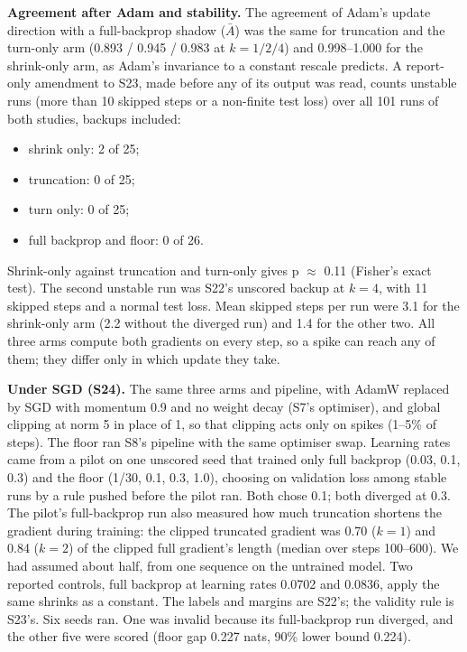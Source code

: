 \documentclass[10pt]{article}
\begin{document}
\textbf{Agreement after Adam and stability.} The agreement of Adam's update direction with a full-backprop shadow ($\bar{A}$) was the same for truncation and the turn-only arm (0.893 / 0.945 / 0.983 at $k = 1 / 2 / 4$) and 0.998--1.000 for the shrink-only arm, as Adam's invariance to a constant rescale predicts. A report-only amendment to S23, made before any of its output was read, counts unstable runs (more than 10 skipped steps or a non-finite test loss) over all 101 runs of both studies, backups included:

\begin{itemize}
\item shrink only: 2 of 25;
\item truncation: 0 of 25;
\item turn only: 0 of 25;
\item full backprop and floor: 0 of 26.
\end{itemize}

Shrink-only against truncation and turn-only gives p $\approx$ 0.11 (Fisher's exact test). The second unstable run was S22's unscored backup at $k = 4$, with 11 skipped steps and a normal test loss. Mean skipped steps per run were 3.1 for the shrink-only arm (2.2 without the diverged run) and 1.4 for the other two. All three arms compute both gradients on every step, so a spike can reach any of them; they differ only in which update they take.

\textbf{Under SGD (S24).} The same three arms and pipeline, with AdamW replaced by SGD with momentum 0.9 and no weight decay (S7's optimiser), and global clipping at norm 5 in place of 1, so that clipping acts only on spikes (1--5\% of steps). The floor ran S8's pipeline with the same optimiser swap. Learning rates came from a pilot on one unscored seed that trained only full backprop (0.03, 0.1, 0.3) and the floor (1/30, 0.1, 0.3, 1.0), choosing on validation loss among stable runs by a rule pushed before the pilot ran. Both chose 0.1; both diverged at 0.3. The pilot's full-backprop run also measured how much truncation shortens the gradient during training: the clipped truncated gradient was 0.70 ($k = 1$) and 0.84 ($k = 2$) of the clipped full gradient's length (median over steps 100--600). We had assumed about half, from one sequence on the untrained model. Two reported controls, full backprop at learning rates 0.0702 and 0.0836, apply the same shrinks as a constant. The labels and margins are S22's; the validity rule is S23's. Six seeds ran. One was invalid because its full-backprop run diverged, and the other five were scored (floor gap 0.227 nats, 90\% lower bound 0.224).
\end{document}
